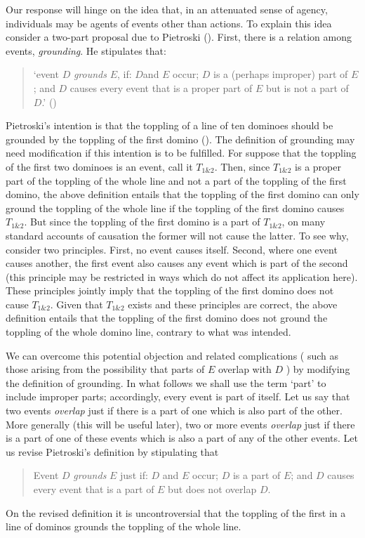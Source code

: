 \documentclass[12pt,a4paper]{extarticle}
\begin{document}
Our response will hinge on the idea that, in an attenuated sense of agency,  individuals may be agents of events other than actions.
To explain this idea consider a two-part proposal due to Pietroski (\citeyear{pietroski_actions_1998,pietroski2002causing}).
First, there is a relation among events, \emph{grounding}.  
He stipulates that: 
%
\begin{quote}
`event $D$ \emph{grounds} $E$, if: $D$and $E$ occur; 
$D$ is a (perhaps improper) part of $E$; and 
$D$ causes every event that is a proper part of $E$ but is not a part of $D$.'
(\citeyear[p.\ 81]{pietroski_actions_1998})
\end{quote}
%
Pietroski's intention is that the toppling of a line of ten dominoes should be grounded by the toppling of the first domino 
(\citeyear[p.\ 81]{pietroski_actions_1998}).
The definition of grounding may need modification if this intention is to be fulfilled.
For suppose that the toppling of the first two dominoes is an event, call it $T_{1\&2}$.
Then, since $T_{1\&2}$ is a proper part of the toppling of the whole line and not a part of the toppling of the first domino,
the above definition entails that
the toppling of the first domino can only ground the toppling of the whole line if the toppling of the first domino causes $T_{1\&2}$.
But since the toppling of the first domino is a part of $T_{1\&2}$, on many standard accounts of causation the former will not cause the latter.
To see why, consider two principles.  
First, no event causes itself.  
Second, where one event causes another, the first event also causes any event which is part of the second (this principle may be restricted in ways which do not affect its application here).  
These principles jointly imply that the toppling of the first domino does not cause $T_{1\&2}$.
Given that $T_{1\&2}$ exists and these principles are correct, the above definition entails that the toppling of the first domino does not ground the toppling of the whole domino line, contrary to what was intended.

We can overcome this potential objection and related complications (%
such as those arising from the possibility that parts of $E$ overlap with $D$%
) by modifying the definition of grounding.
In what follows we shall use the term `part' to include improper parts; accordingly, every event is part of itself.
Let us say that two events \emph{overlap} just if there is a part of one which is also part of the other.
More generally (this will be useful later),
two or more events \emph{overlap} just if there is a part of one of these events which is also a part of any of the other events.
Let us revise Pietroski's definition by stipulating that
%
\begin{quote}
Event $D$ \emph{grounds} $E$  just if: $D$ and $E$ occur; 
$D$ is a  part of $E$; and 
$D$ causes every event that is a part of $E$ but does not overlap $D$.
\end{quote}
%
On the revised definition it is uncontroversial that the toppling of the first in a line of dominos grounds the toppling of the whole line.
\end{document}
